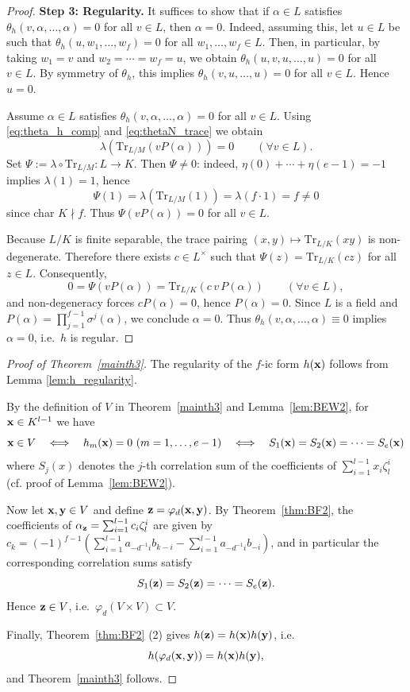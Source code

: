 \documentclass[a4paper, 11pt]{amsart}
\newcommand{\Tr}{\mathrm{Tr}}
\theoremstyle{plain}
\theoremstyle{definition}
\numberwithin{equation}{section}
\begin{document}
\begin{proof}
\medskip\noindent
\textbf{Step 3: Regularity.}
It suffices to show that if $\alpha \in L$ satisfies $\theta_h(v,\alpha,\dots,\alpha)=0$ for all $v\in L$,
then $\alpha=0$.
Indeed, assuming this, let $u\in L$ be such that
$\theta_h(u,w_1,\dots,w_f)=0$ for all $w_1,\dots,w_f\in L$.
Then, in particular, by taking $w_1=v$ and $w_2=\cdots=w_f=u$, we obtain
$\theta_h(u,v,u,\dots,u)=0$ for all $v\in L$.
By symmetry of $\theta_h$, this implies
$\theta_h(v,u,\dots,u)=0$ for all $v\in L$.
Hence $u=0$.

Assume $\alpha\in L$ satisfies $\theta_h(v,\alpha,\dots,\alpha)=0$ for all $v\in L$.
Using \eqref{eq:theta_h_comp} and \eqref{eq:thetaN_trace} we obtain
\[
\lambda\!\left(\Tr_{L/M}(vP(\alpha))\right)=0\qquad(\forall v\in L).
\]
Set $\Psi:=\lambda\circ\Tr_{L/M}:L\to K$. 
Then $\Psi\neq 0$: indeed, $\eta(0)+\cdots+\eta(e-1)=-1$ implies $\lambda(1)=1$, hence
\[
\Psi(1)=\lambda\!\left(\Tr_{L/M}(1)\right)=\lambda(f\cdot 1)=f\neq 0
\]
since char $K\nmid f$.
Thus $\Psi(vP(\alpha))=0$ for all $v\in L$.

Because $L/K$ is finite separable, the trace pairing $(x,y)\mapsto\Tr_{L/K}(xy)$ is non-degenerate.
Therefore there exists $c\in L^\times$ such that $\Psi(z)=\Tr_{L/K}(cz)$ for all $z\in L$. 
Consequently,
\[
0=\Psi(vP(\alpha))=\Tr_{L/K}(c\,v\,P(\alpha))\qquad(\forall v\in L),
\]
and non-degeneracy forces $cP(\alpha)=0$, hence $P(\alpha)=0$. Since $L$ is a field and
$P(\alpha)=\prod_{j=1}^{f-1}\sigma^j(\alpha)$, we conclude $\alpha=0$.
Thus $\theta_h(v,\alpha,\dots,\alpha)\equiv 0$ implies $\alpha=0$, i.e.\ $h$ is regular.
\end{proof}

\begin{proof}[Proof of Theorem~\ref{mainth3}]
The regularity of the $f$-ic form $h({\bf x})$ follows from Lemma \ref{lem:h_regularity}.

By the definition of $V$ in Theorem~\ref{mainth3} and Lemma~\ref{lem:BEW2}, for ${\bf x}\in K^{l-1}$ we have
\[
{\bf x}\in V \quad\Longleftrightarrow\quad h_m({\bf x})=0\ (m=1,\dots,e-1)
\quad\Longleftrightarrow\quad S_1({\bf x})=S_2({\bf x})=\cdots=S_e({\bf x})
\]
where $S_j(x)$ denotes the $j$-th correlation sum of the coefficients of $\sum_{i=1}^{l-1}x_i\zeta_l^{i}$ (cf. proof of Lemma~\ref{lem:BEW2}).

Now let ${\bf x,y}\in V$ and define ${\bf z}=\varphi_d({\bf x,y})$.
By Theorem~\ref{thm:BF2}, the coefficients of $\alpha_{\bf z}=\sum_{i=1}^{l-1}c_i\zeta_l^i$ are given by $c_k=(-1)^{f-1}\left( \sum_{i=1}^{l-1}a_{-d^{-1}i}b_{k-i} - \sum_{i=1}^{l-1}a_{-d^{-1}i}b_{-i}\right)$, and in
particular the corresponding correlation sums satisfy
\[
S_1({\bf z})=S_2({\bf z})=\cdots=S_e({\bf z}).
\]
Hence ${\bf z}\in V$, i.e.\ $\varphi_d(V\times V)\subset V$.

Finally, Theorem~\ref{thm:BF2} (2) gives $h({\bf z})=h({\bf x})h({\bf y})$, i.e.
\[
h(\varphi_d({\bf x,y}))=h({\bf x})h({\bf y}),
\]
and Theorem~\ref{mainth3} follows.
\end{proof}
\end{document}

